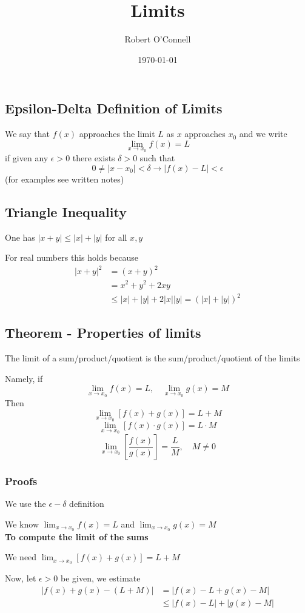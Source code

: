 \documentclass{article}
\title{\textbf{Limits}}
\author{Robert O'Connell}
\date{\today}
\begin{document}
\maketitle
\subsection*{Epsilon-Delta Definition of Limits}
We say that \(f(x)\) approaches the limit \(L\) as \(x\) approaches \(x_0\) and we write
\[
\lim_{x\to x_0}{f(x)} = L
\]
if given any \(\epsilon > 0 \) there exists \(\delta > 0 \) such that
\[
0 \neq |x-x_0| < \delta \rightarrow |f(x)-L| < \epsilon
\]
(for examples see written notes)

\subsection*{Triangle Inequality}
One has \(|x+y| \leq |x| + |y|\) for all \(x,y\)

For real numbers this holds because
\begin{align*}
    |x+y|^2 &= (x+y)^2 \\
    &= x^2 +y^2+2xy \\
    &\leq |x| + |y| + 2|x||y| = (|x| + |y|)^2
\end{align*}


\subsection*{Theorem - Properties of limits}
The limit of a sum/product/quotient is the sum/product/quotient of the limits

Namely, if
\[
\lim_{x\to x_0}{f(x)} = L, \quad \lim_{x\to x_0}{g(x)} = M
\]
Then
\[
\lim_{x\to x_0}{[f(x)+g(x)]} = L + M
\]
\[
\lim_{x\to x_0}{[f(x)\cdot g(x)]} = L \cdot M
\]
\[
\lim_{x\to x_0}{\left[\frac{f(x)}{g(x)}\right]} = \frac{L}{M}, \quad M \neq 0
\]

\subsubsection*{Proofs}
We use the \(\epsilon - \delta\) definition

We know \(\lim_{x\to x_0}{f(x)} = L\) and \(\lim_{x\to x_0}{g(x)} = M\)
\\

\textbf{To compute the limit of the sums}

We need \(\lim_{x\to x_0}{[f(x) + g(x)]} = L + M\)

Now, let \(\epsilon > 0 \) be given, we estimate
\begin{align*}
    |f(x) + g(x) - (L+M)| &= |f(x) - L + g(x)-M| \\
    &\leq |f(x)-L| + |g(x)-M| 
\end{align*}
\end{document}
